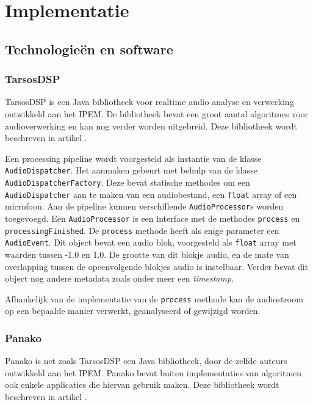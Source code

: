\chapter{Implementatie}

\section{Technologieën en software}

\subsection{TarsosDSP}

TarsosDSP is een Java bibliotheek voor realtime audio analyse en verwerking ontwikkeld aan het IPEM. De bibliotheek bevat een groot aantal algoritmes voor audioverwerking en kan nog verder worden uitgebreid. Deze bibliotheek wordt beschreven in artikel \cite{six2014tarsosdsp}. 

Een processing pipeline wordt voorgesteld als instantie van de klasse \texttt{AudioDispatcher}. Het aanmaken gebeurt met behulp van de klasse \texttt{AudioDispatcherFactory}. Deze bevat statische methodes om een \texttt{AudioDispatcher} aan te maken van een audiobestand, een \texttt{float} array of een microfoon. Aan de pipeline kunnen verschillende \texttt{AudioProcessor}s worden toegevoegd. Een \texttt{AudioProcessor} is een interface met de methodes \texttt{process} en \texttt{processingFinished}. De \texttt{process} methode heeft als enige parameter een \texttt{AudioEvent}. Dit object bevat een audio blok, voorgesteld als \texttt{float} array met waarden tussen -1.0 en 1.0. De grootte van dit blokje audio, en de mate van overlapping tussen de opeenvolgende blokjes audio is instelbaar. Verder bevat dit object nog andere metadata zoals onder meer een \textit{timestamp}.

Afhankelijk van de implementatie van de \texttt{process} methode kan de audiostroom op een bepaalde manier verwerkt, geanalyseerd of gewijzigd worden.

\subsection{Panako}

Panako is net zoals TarsosDSP een Java bibliotheek, door de zelfde auteurs ontwikkeld aan het IPEM. Panako bevat buiten implementaties van algoritmen ook enkele applicaties die hiervan gebruik maken.  Deze bibliotheek wordt beschreven in artikel \cite{six2014panako}.

